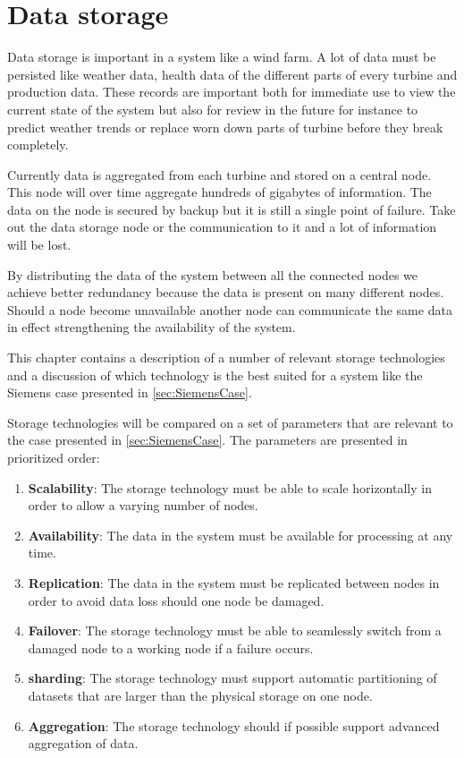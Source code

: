 \chapter{Data storage}
Data storage is important in a system like a wind farm.
A lot of data must be persisted like weather data, health data of the different parts of every turbine and production data.
These records are important both for immediate use to view the current state of the system but also for review in the future for instance to predict weather trends or replace worn down parts of turbine before they break completely.

Currently data is aggregated from each turbine and stored on a central node.
This node will over time aggregate hundreds of gigabytes of information.
The data on the node is secured by backup but it is still a single point of failure.
Take out the data storage node or the communication to it and a lot of information will be lost.

By distributing the data of the system between all the connected nodes we achieve better redundancy because the data is present on many different nodes.
Should a node become unavailable another node can communicate the same data in effect strengthening the availability of the system.

This chapter contains a description of a number of relevant storage technologies and a discussion of which technology is the best suited for a system like the Siemens case presented in \cref{sec:SiemensCase}.

Storage technologies will be compared on a set of parameters that are relevant to the case presented in \cref{sec:SiemensCase}. The parameters are presented in prioritized order:

\begin{enumerate}
\item \label{enum:parameters:availability} \textbf{Scalability}: The storage technology must be able to scale horizontally in order to allow a varying number of nodes.
\item \textbf{Availability}: The data in the system must be available for processing at any time.
\item \textbf{Replication}: The data in the system must be replicated between nodes in order to avoid data loss should one node be damaged.
\item \textbf{Failover}: The storage technology must be able to seamlessly switch from a damaged node to a working node if a failure occurs.
\item \textbf{sharding}: The storage technology must support automatic partitioning of datasets that are larger than the physical storage on one node.
\item \textbf{Aggregation}: The storage technology should if possible support advanced aggregation of data.
\end{enumerate}

